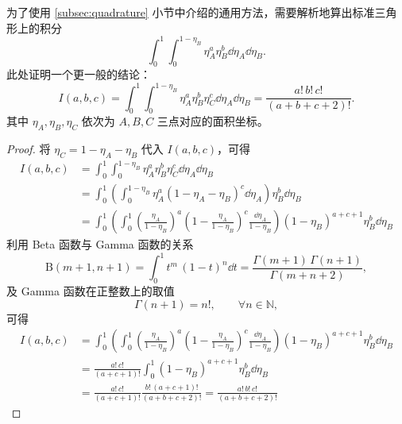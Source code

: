 为了使用 \ref{subsec:quadrature} 小节中介绍的通用方法，需要解析地算出标准三角形上的积分
\begin{equation}
\int_{0}^{1}\int_{0}^{1-\eta_{B}}\eta_{A}^{a}\eta_{B}^{b}\dd{\eta_{A}}\dd{\eta_{B}}.
\end{equation}
此处证明一个更一般的结论：
\begin{equation}
I(a,b,c)=\int_{0}^{1}\int_{0}^{1-\eta_{B}}\eta_{A}^{a}\eta_{B}^{b}\eta_{C}^{c}\dd{\eta_{A}}\dd{\eta_{B}}=\frac{a!\,b!\,c!}{(a+b+c+2)!}.
\end{equation}
其中 $\eta_{A},\eta_{B},\eta_{C}$ 依次为 $A,B,C$ 三点对应的面积坐标。
\begin{proof}
将 $\eta_{C}=1-\eta_{A}-\eta_{B}$ 代入 $I(a,b,c)$，可得
\begin{equation}
\begin{aligned}I(a,b,c) & =\int_{0}^{1}\int_{0}^{1-\eta_{B}}\eta_{A}^{a}\eta_{B}^{b}\eta_{C}^{c}\dd{\eta_{A}}\dd{\eta_{B}}\\
 & =\int_{0}^{1}\left(\int_{0}^{1-\eta_{B}}\eta_{A}^{a}\left(1-\eta_{A}-\eta_{B}\right)^{c}\dd{\eta_{A}}\right)\eta_{B}^{b}\dd{\eta_{B}}\\
 & =\int_{0}^{1}\left(\int_{0}^{1}\left(\frac{\eta_{A}}{1-\eta_{B}}\right)^{a}\left(1-\frac{\eta_{A}}{1-\eta_{B}}\right)^{c}\frac{\dd{\eta_{A}}}{1-\eta_{B}}\right)(1-\eta_{B})^{a+c+1}\eta_{B}^{b}\dd{\eta_{B}}
\end{aligned}
\end{equation}
利用 Beta 函数与 Gamma 函数的关系
\begin{equation}
\mathrm{B}(m+1,n+1)=\int_{0}^{1}t^{m}\,(1-t)^{n}\dd{t}=\frac{\Gamma(m+1)\,\Gamma(n+1)}{\Gamma(m+n+2)},
\end{equation}
及 Gamma 函数在正整数上的取值
\begin{equation}
\Gamma(n+1)=n!,\qquad\forall n\in\mathbb{N},
\end{equation}
可得
\begin{equation}
\begin{aligned}I(a,b,c) & =\int_{0}^{1}\left(\int_{0}^{1}\left(\frac{\eta_{A}}{1-\eta_{B}}\right)^{a}\left(1-\frac{\eta_{A}}{1-\eta_{B}}\right)^{c}\frac{\dd{\eta_{A}}}{1-\eta_{B}}\right)(1-\eta_{B})^{a+c+1}\eta_{B}^{b}\dd{\eta_{B}}\\
 & =\frac{a!\,c!}{(a+c+1)!}\int_{0}^{1}(1-\eta_{B})^{a+c+1}\eta_{B}^{b}\dd{\eta_{B}}\\
 & =\frac{a!\,c!}{(a+c+1)!}\frac{b!\,(a+c+1)!}{(a+b+c+2)!}=\frac{a!\,b!\,c!}{(a+b+c+2)!}
\end{aligned}
\end{equation}
\end{proof}
%

